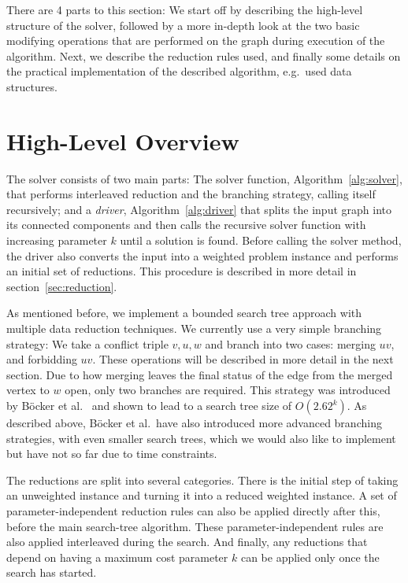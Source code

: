 \documentclass[12pt,oneside,english,parskip=full,headings=small]{scrbook}
\theoremstyle{definition}
\begin{document}
There are 4 parts to this section: We start off by describing the high-level structure of the
solver, followed by a more in-depth look at the two basic modifying operations that are performed on
the graph during execution of the algorithm. Next, we describe the reduction rules used, and finally
some details on the practical implementation of the described algorithm, e.g.\ used data structures.

\section{High-Level Overview}

The solver consists of two main parts: The solver function, Algorithm~\ref{alg:solver}, that
performs interleaved reduction and the branching strategy, calling itself recursively; and a
\emph{driver}, Algorithm~\ref{alg:driver} that splits the input graph into its connected components
and then calls the recursive solver function with increasing parameter $k$ until a solution is
found. Before calling the solver method, the driver also converts the input into a weighted problem
instance and performs an initial set of reductions. This procedure is described in more detail in
section~\ref{sec:reduction}.

As mentioned before, we implement a bounded search tree approach with multiple data reduction
techniques. We currently use a very simple branching strategy: We take a conflict triple $v, u, w$
and branch into two cases: merging $uv$, and forbidding $uv$. These operations will be described in
more detail in the next section. Due to how merging leaves the final status of the edge from the
merged vertex to $w$ open, only two branches are required. This strategy was introduced by Böcker et
al.~\cite{GoingWeighted} and shown to lead to a search tree size of $O(2.62^k)$. As described above,
Böcker et al.\ have also introduced more advanced branching strategies, with even smaller search
trees, which we would also like to implement but have not so far due to time constraints.

The reductions are split into several categories. There is the initial step of taking an
unweighted instance and turning it into a reduced weighted instance. A set of parameter-independent
reduction rules can also be applied directly after this, before the main search-tree algorithm.
These parameter-independent rules are also applied interleaved during the search. And finally, any
reductions that depend on having a maximum cost parameter $k$ can be applied only once the search
has started.
\end{document}
